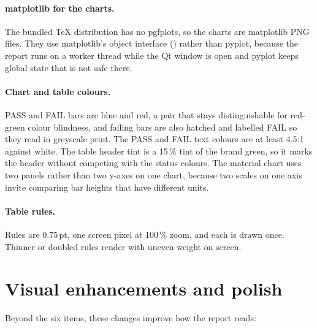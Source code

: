 \documentclass[11pt,a4paper]{article}
\newcommand{\code}[1]{\texttt{\detokenize{#1}}}
\begin{document}
\paragraph{matplotlib for the charts.} The bundled TeX distribution has no pgfplots, so the charts are matplotlib PNG files. They use matplotlib's object interface (\code{Figure}) rather than pyplot, because the report runs on a worker thread while the Qt window is open and pyplot keeps global state that is not safe there.

\paragraph{Chart and table colours.} PASS and FAIL bars are blue and red, a pair that stays distinguishable for red-green colour blindness, and failing bars are also hatched and labelled FAIL so they read in greyscale print. The PASS and FAIL text colours are at least 4.5:1 against white. The table header tint is a 15\,\% tint of the brand green, so it marks the header without competing with the status colours. The material chart uses two panels rather than two y-axes on one chart, because two scales on one axis invite comparing bar heights that have different units.

\paragraph{Table rules.} Rules are 0.75\,pt, one screen pixel at 100\,\% zoom, and each is drawn once. Thinner or doubled rules render with uneven weight on screen.

\section{Visual enhancements and polish}
\label{sec:polish}

Beyond the six items, these changes improve how the report reads:
\end{document}
